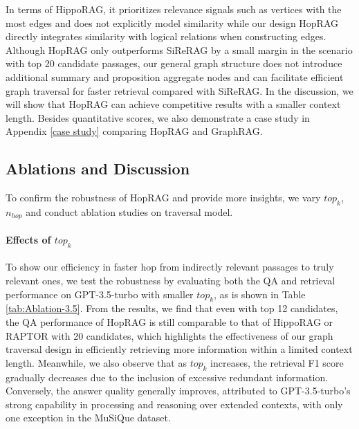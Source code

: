 In terms of HippoRAG, it prioritizes relevance signals such as vertices with the most edges and does not explicitly model similarity while our design HopRAG directly integrates similarity with logical relations when constructing edges. Although HopRAG only outperforms SiReRAG by a small margin in the scenario with top 20 candidate passages, our general graph structure does not introduce additional summary and proposition aggregate nodes and can facilitate efficient graph traversal for faster retrieval compared with SiReRAG. In the discussion, we will show that HopRAG can achieve competitive results with a smaller context length. Besides quantitative scores, we also demonstrate a case study in Appendix \ref{case study} comparing HopRAG and GraphRAG.
\subsection{Ablations and Discussion}
\label{ablation}
To confirm the robustness of HopRAG and provide more insights, we vary $top_k$, $n_{hop}$ and conduct ablation studies on traversal model. 
\paragraph{Effects of $top_k$} To show our efficiency in faster hop from indirectly relevant passages to truly relevant ones, we test the robustness by evaluating both the QA and retrieval performance on GPT-3.5-turbo with smaller $top_k$, as is shown in Table \ref{tab:Ablation-3.5}. From the results, we find that even with top 12 candidates, the QA performance of HopRAG is still comparable to that of HippoRAG or RAPTOR with 20 candidates, which highlights the effectiveness of our graph traversal design in efficiently retrieving more information within a limited context length. 
Meanwhile, we also observe that as $top_k$ increases, the retrieval F1 score gradually decreases due to the inclusion of excessive redundant information. Conversely, the answer quality generally improves, attributed to GPT-3.5-turbo's strong capability in processing and reasoning over extended contexts, with only one exception in the MuSiQue dataset.

